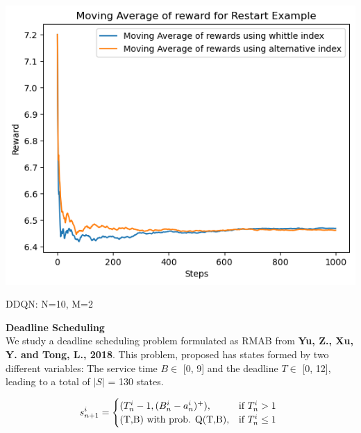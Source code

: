 \documentclass{slides}
\begin{document}
{{\begin{center}
\includegraphics[scale=0.75]{restart_dqn.png}
\end{center}

\begin{center}
    
\begin{small}
\vspace{-10mm}
\hspace{5mm}DDQN: N=10, M=2\end{small}

 \end{center}
\newpage

\textbf{Deadline Scheduling}\\
We study a deadline scheduling problem formulated as RMAB from \textbf{Yu, Z., Xu, Y. and Tong, L., 2018}. This problem, proposed has states formed by two different variables: The service time $B \in$ [0, 9] and
the deadline $T \in$ [0, 12], leading to a total of $|S|$ = 130 states. 

\begin{equation*}
s_{n+1}^i=\begin{cases}
(T_n^i-1, (B_n^i-a_n^i)^+), & \text{if } T_n^i>1 \\
$(T,B)$ \text{ with prob. } $Q(T,B)$, &   \text{if $T_n^i\leq 1$ }


\end{cases}
\end{equation*}}}
\end{document}
